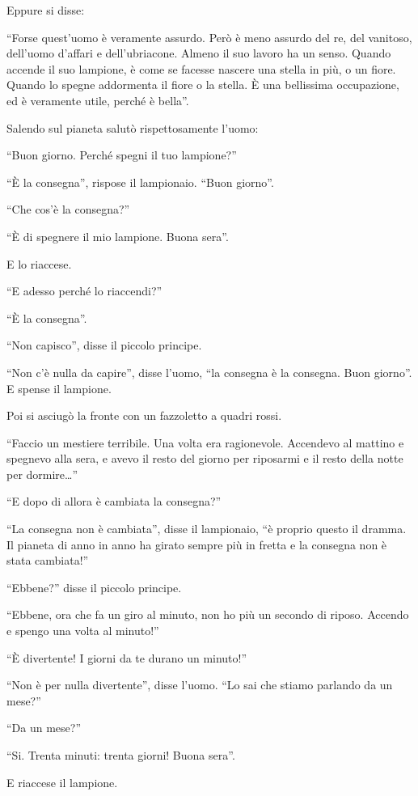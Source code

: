 \documentclass[11pt]{scrbook}
\begin{document}
Eppure si disse:

``Forse quest'uomo è veramente assurdo. Però è meno assurdo del re, del vanitoso, dell'uomo d'affari e dell'ubriacone. Almeno il suo lavoro ha un senso. Quando accende il suo lampione, è come se facesse nascere una stella in più, o un fiore. Quando lo spegne addormenta il fiore o la stella. È una bellissima occupazione, ed è veramente utile, perché è bella''.

Salendo sul pianeta salutò rispettosamente l'uomo:

``Buon giorno. Perché spegni il tuo lampione?''

``È la consegna'', rispose il lampionaio. ``Buon giorno''.

``Che cos'è la consegna?''

``È di spegnere il mio lampione. Buona sera''.

E lo riaccese.

``E adesso perché lo riaccendi?''

``È la consegna''.

``Non capisco'', disse il piccolo principe.

``Non c'è nulla da capire'', disse l'uomo, ``la consegna è la consegna. Buon giorno''. E spense il lampione.

Poi si asciugò la fronte con un fazzoletto a quadri rossi.

``Faccio un mestiere terribile. Una volta era ragionevole. Accendevo al mattino e spegnevo alla sera, e avevo il resto del giorno per riposarmi e il resto della notte per dormire\ldots{}''

``E dopo di allora è cambiata la consegna?''

``La consegna non è cambiata'', disse il lampionaio, ``è proprio questo il dramma. Il pianeta di anno in anno ha girato sempre più in fretta e la consegna non è stata cambiata!''

``Ebbene?'' disse il piccolo principe.

``Ebbene, ora che fa un giro al minuto, non ho più un secondo di riposo. Accendo e spengo una volta al minuto!''

``È divertente! I giorni da te durano un minuto!''

``Non è per nulla divertente'', disse l'uomo. ``Lo sai che stiamo parlando da un mese?''

``Da un mese?''

``Si. Trenta minuti: trenta giorni! Buona sera''.

E riaccese il lampione.
\end{document}
